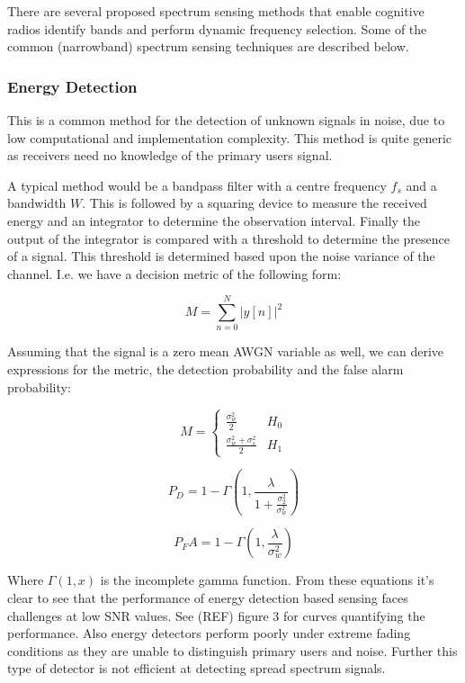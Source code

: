 \documentclass[conference]{IEEEtran}
\begin{document}
There are several proposed spectrum sensing methods that enable cognitive radios identify bands and perform dynamic frequency selection. Some of the common (narrowband) spectrum sensing techniques are described below.

\subsubsection{Energy Detection}
This is a common method for the detection of unknown signals in noise, due to low computational and implementation complexity. This method is quite generic as receivers need no knowledge of the primary users signal. 

A typical method would be a bandpass filter with a centre frequency \(f_{s}\) and a bandwidth \(W\). This is followed by a squaring device to measure the received energy and an integrator to determine the observation interval. Finally the output of the integrator is compared with a threshold to determine the presence of a signal. This threshold is determined based upon the noise variance of the channel. I.e. we have a decision metric of the following form:

\begin{equation}
M = \sum_{n=0}^N |y\left[n\right]|^2
\end{equation}

Assuming that the signal is a zero mean AWGN variable as well, we can derive expressions for the metric, the detection probability and the false alarm probability:

\begin{equation}
 M =
  \begin{cases}
   \frac{\sigma_w^2}{2} & H_0 \\
   \frac{\sigma_w^2 + \sigma_s^2}{2} & H_1
  \end{cases}
\end{equation}

\begin{equation}
P_D = 1 - \Gamma\left(1, \frac{\lambda}{1 + \frac{ \sigma_2^2 }{ \sigma_w^2 } } \right)
\end{equation}

\begin{equation}
P_FA = 1 - \Gamma\left(1, \frac{\lambda}{\sigma_w^2} \right)
\end{equation}

Where \( \Gamma\left(1,x\right)\) is the incomplete gamma function. From these equations it's clear to see that the performance of energy detection based sensing faces challenges at low SNR values. See (REF) figure 3 for curves quantifying the performance. Also energy detectors perform poorly under extreme fading conditions as they are unable to distinguish primary users and noise. Further this type of detector is not efficient at detecting spread spectrum signals. 
\end{document}
